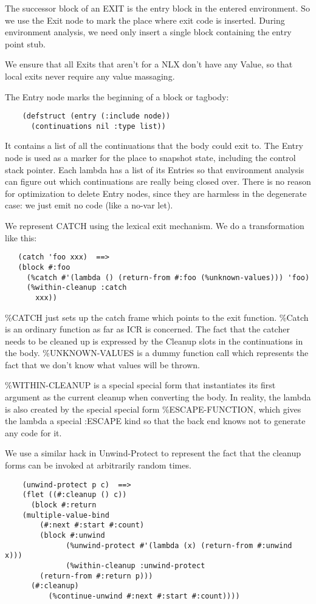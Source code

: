 The successor block of an EXIT is the entry block in the entered environment.
So we use the Exit node to mark the place where exit code is inserted.  During
environment analysis, we need only insert a single block containing the entry
point stub.

We ensure that all Exits that aren't for a NLX don't have any Value, so that
local exits never require any value massaging.

The Entry node marks the beginning of a block or tagbody:
\begin{verbatim} 
    (defstruct (entry (:include node))
      (continuations nil :type list)) 
\end{verbatim}
It contains a list of all the continuations that the body could exit to.  The
Entry node is used as a marker for the place to snapshot state, including
the control stack pointer.  Each lambda has a list of its Entries so
that environment analysis can figure out which continuations are really being
closed over.  There is no reason for optimization to delete Entry nodes,
since they are harmless in the degenerate case: we just emit no code (like a
no-var let).


We represent CATCH using the lexical exit mechanism.  We do a transformation
like this:
\begin{verbatim}
   (catch 'foo xxx)  ==>
   (block #:foo
     (%catch #'(lambda () (return-from #:foo (%unknown-values))) 'foo)
     (%within-cleanup :catch
       xxx))
\end{verbatim}

\%CATCH just sets up the catch frame which points to the exit function.  \%Catch
is an ordinary function as far as ICR is concerned.  The fact that the catcher
needs to be cleaned up is expressed by the Cleanup slots in the continuations
in the body.  \%UNKNOWN-VALUES is a dummy function call which represents the
fact that we don't know what values will be thrown.  

\%WITHIN-CLEANUP is a special special form that instantiates its first argument
as the current cleanup when converting the body.  In reality, the lambda is
also created by the special special form \%ESCAPE-FUNCTION, which gives the
lambda a special :ESCAPE kind so that the back end knows not to generate any
code for it.


We use a similar hack in Unwind-Protect to represent the fact that the cleanup
forms can be invoked at arbitrarily random times.

\begin{verbatim}
    (unwind-protect p c)  ==>
    (flet ((#:cleanup () c))
      (block #:return
	(multiple-value-bind
	    (#:next #:start #:count)
	    (block #:unwind
              (%unwind-protect #'(lambda (x) (return-from #:unwind x)))
              (%within-cleanup :unwind-protect
		(return-from #:return p)))
	  (#:cleanup)
          (%continue-unwind #:next #:start #:count))))
\end{verbatim}

